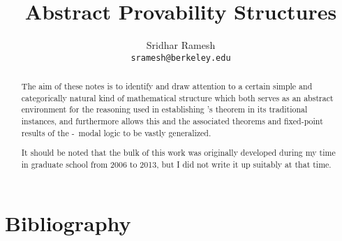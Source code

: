 \documentclass[12pt]{article}
\title{Abstract Provability Structures}
\author{
  Sridhar Ramesh\\
  \texttt{sramesh@berkeley.edu}
}
\begin{document}
\maketitle

\begin{abstract}
The aim of these notes is to identify and draw attention to a certain simple and categorically natural kind of mathematical structure which both serves as an abstract environment for the reasoning used in establishing \Loeb's theorem in its traditional instances, and furthermore allows this and the associated theorems and fixed-point results of the \Goedel-\Loeb\ modal logic to be vastly generalized.

It should be noted that the bulk of this work was originally developed during my time in graduate school from 2006 to 2013, but I did not write it up suitably at that time.
\end{abstract}

\newpage
{}
\setcounter{page}{1}
\tableofcontents

\newpage 

\newpage 

\newpage 

\newpage 

\newpage 

\newpage 

\newpage 



\newpage 

\newpage \section{Bibliography}
\printbibliography

\printindex
\end{document}
